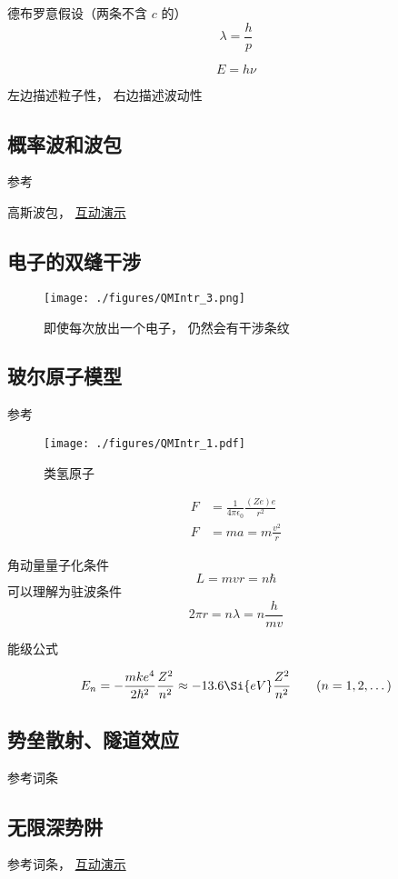德布罗意假设（两条不含 $c$ 的）
\begin{equation}
\lambda = \frac{h}{p}
\end{equation}

\begin{equation}
E = h\nu
\end{equation}

左边描述粒子性， 右边描述波动性

\subsection{概率波和波包}
参考

高斯波包， \href{https://wuli.wiki/apps/gausWP.html}{互动演示}

\subsection{电子的双缝干涉}

\begin{figure}[ht]
\centering
\texttt{[image: ./figures/QMIntr\_3.png]}
\caption{即使每次放出一个电子， 仍然会有干涉条纹} \label{QMIntr_fig3}
\end{figure}

\subsection{玻尔原子模型}

参考

\begin{figure}[ht]
\centering
\texttt{[image: ./figures/QMIntr\_1.pdf]}
\caption{类氢原子} \label{QMIntr_fig1}
\end{figure}

\begin{equation}
\begin{aligned}
F &= \frac{1}{4\pi \epsilon_0} \frac{(Ze)e}{r^2}
\\
F &= ma = m\frac{v^2}{r}
\end{aligned}
\end{equation}

角动量量子化条件
\begin{equation}
L = mvr = n\hbar
\end{equation}
可以理解为驻波条件
\begin{equation}
2\pi r = n \lambda = n \frac{h}{mv}
\end{equation}

能级公式

\begin{equation}
E_n =  - \frac{m k e^4}{2 \hbar ^2} \frac{Z^2}{n^2} \approx - 13.6\Si{eV} \frac{Z^2}{n^2}
\qquad (n = 1, 2, \dots)
\end{equation}

\subsection{势垒散射、隧道效应}
参考词条

\subsection{无限深势阱}
参考词条， \href{https://wuli.wiki/apps/QMISW.html}{互动演示}
